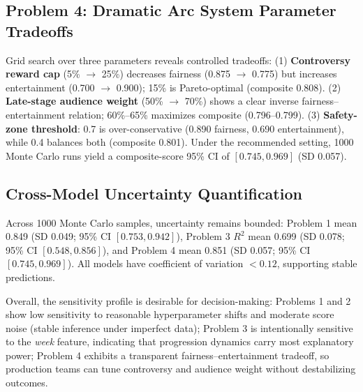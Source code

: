 \subsection{Problem 4: Dramatic Arc System Parameter Tradeoffs}

Grid search over three parameters reveals controlled tradeoffs: (1) \textbf{Controversy reward cap} (5\% $\rightarrow$ 25\%) decreases fairness (0.875 $\rightarrow$ 0.775) but increases entertainment (0.700 $\rightarrow$ 0.900); 15\% is Pareto-optimal (composite 0.808). (2) \textbf{Late-stage audience weight} (50\% $\rightarrow$ 70\%) shows a clear inverse fairness--entertainment relation; 60\%--65\% maximizes composite (0.796--0.799). (3) \textbf{Safety-zone threshold}: 0.7 is over-conservative (0.890 fairness, 0.690 entertainment), while 0.4 balances both (composite 0.801). Under the recommended setting, 1000 Monte Carlo runs yield a composite-score 95\% CI of $[0.745, 0.969]$ (SD 0.057).

\subsection{Cross-Model Uncertainty Quantification}

Across 1000 Monte Carlo samples, uncertainty remains bounded: Problem 1 mean 0.849 (SD 0.049; 95\% CI $[0.753, 0.942]$), Problem 3 $R^2$ mean 0.699 (SD 0.078; 95\% CI $[0.548, 0.856]$), and Problem 4 mean 0.851 (SD 0.057; 95\% CI $[0.745, 0.969]$). All models have coefficient of variation $<0.12$, supporting stable predictions.

Overall, the sensitivity profile is desirable for decision-making: Problems 1 and 2 show low sensitivity to reasonable hyperparameter shifts and moderate score noise (stable inference under imperfect data); Problem 3 is intentionally sensitive to the \textit{week} feature, indicating that progression dynamics carry most explanatory power; Problem 4 exhibits a transparent fairness--entertainment tradeoff, so production teams can tune controversy and audience weight without destabilizing outcomes.